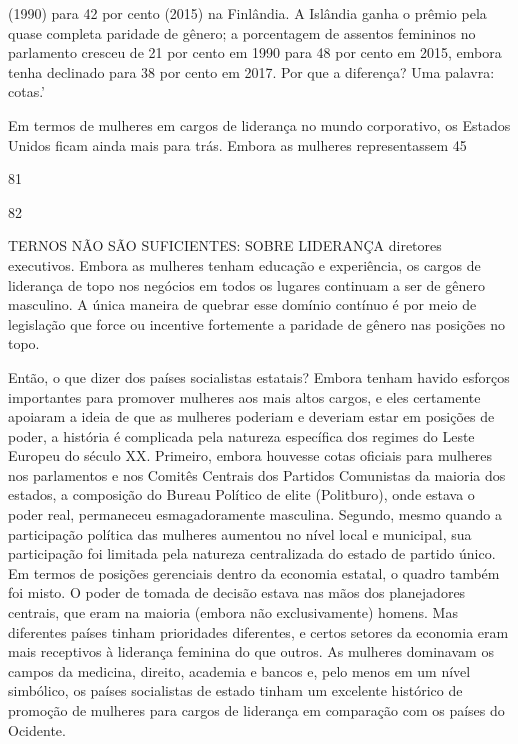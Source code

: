  \par 
(1990) para {\color{blue}42} por cento (2015) na Finlândia. A Islândia ganha o prêmio pela quase completa paridade de gênero; a porcentagem de assentos femininos no parlamento cresceu de {\color{blue}21} por cento em 1990 para {\color{blue}48} por cento em 2015, embora tenha declinado para {\color{blue}38} por cento em 2017. Por que a diferença? Uma palavra: cotas.’
 \par 
Em termos de mulheres em cargos de liderança no mundo corporativo, os Estados Unidos ficam ainda mais para trás. Embora as mulheres representassem 45%
 \par 
81
 \par 
82
 \par 
TERNOS NÃO SÃO SUFICIENTES: SOBRE LIDERANÇA diretores executivos. Embora as mulheres tenham educação e experiência, os cargos de liderança de topo nos negócios em todos os lugares continuam a ser de gênero masculino. A única maneira de quebrar esse domínio contínuo é por meio de legislação que force ou incentive fortemente a paridade de gênero nas posições no topo.
 \par 
Então, o que dizer dos países socialistas estatais? Embora tenham havido esforços importantes para promover mulheres aos mais altos cargos, e eles certamente apoiaram a ideia de que as mulheres poderiam e deveriam estar em posições de poder, a história é complicada pela natureza específica dos regimes do Leste Europeu do século XX. Primeiro, embora houvesse cotas oficiais para mulheres nos parlamentos e nos Comitês Centrais dos Partidos Comunistas da maioria dos estados, a composição do Bureau Político de elite (Politburo), onde estava o poder real, permaneceu esmagadoramente masculina. Segundo, mesmo quando a participação política das mulheres aumentou no nível local e municipal, sua participação foi limitada pela natureza centralizada do estado de partido único. Em termos de posições gerenciais dentro da economia estatal, o quadro também foi misto. O poder de tomada de decisão estava nas mãos dos planejadores centrais, que eram na maioria (embora não exclusivamente) homens. Mas diferentes países tinham prioridades diferentes, e certos setores da economia eram mais receptivos à liderança feminina do que outros. As mulheres dominavam os campos da medicina, direito, academia e bancos e, pelo menos em um nível simbólico, os países socialistas de estado tinham um excelente histórico de promoção de mulheres para cargos de liderança em comparação com os países do Ocidente.
